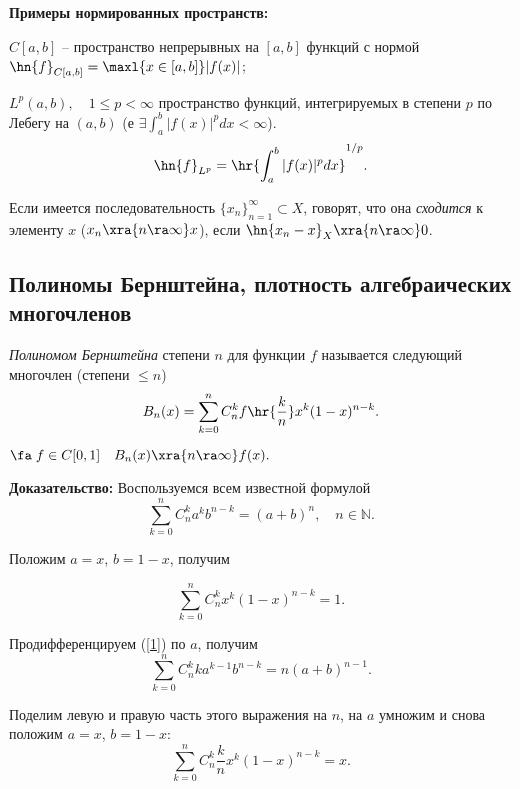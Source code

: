 \documentclass[a4paper]{article}
\begin{document}
\noindent\textbf{Примеры нормированных пространств:}

\begin{denote}
  $C[a,b]$ -- пространство непрерывных на $[a,b]$ функций с нормой
  $\hn{f}_{C[a,b]}=\maxl{x\in[a,b]}|f(x)|$;
\end{denote}

\begin{denote}
  $L^p(a,b),\quad 1\le p<\infty$ пространство функций, интегрируемых в
  степени $p$ по Лебегу на $(a,b)$ (е
  $\exi\int_a^b|f(x)|^pdx<\infty$).
  $$\hn{f}_{L^p}=\hr{\int_a^b|f(x)|^pdx }^{1/p}.$$
\end{denote}

\begin{df}
  Если имеется последовательность
  $\{x_n\}_{n=1}^{\infty}\subset X$, говорят, что она
  \emph{сходится} к элементу $x$ ($x_n\xra{n\ra\infty} x$), если
  $\hn{x_n-x}_X\xra{n\ra\infty} 0$.
\end{df}

\subsection{Полиномы Бернштейна, плотность алгебраических
многочленов}

\begin{df}
  \emph{Полиномом Бернштейна} степени $n$ для функции
  $f$ называется следующий многочлен (степени $\le n$)
  $$B_n(x)=\sum\limits_{k=0}^n C_n^k f\hr{\frac{k}{n}}x^k(1-x)^{n-k}.$$
\end{df}
\begin{theorem}[Бернштейн]
$\fa \;f\in C[0,1]\quad B_n(x)\xra{n\ra\infty}
f(x).$
\end{theorem}
\textbf{Доказательство:} Воспользуемся всем известной формулой
\begin{equation}\label{1}
\sum_{k=0}^n C_n^k a^k b^{n-k}=(a+b)^n,\quad n\in\mathbb{N}.
\end{equation}

Положим $a=x$, $b=1-x$, получим

\begin{equation}\label{2}
\sum_{k=0}^n C_n^k x^k (1-x)^{n-k}=1.
\end{equation}

Продифференцируем (\ref{1}) по $a$, получим
\begin{equation}\label{3}
\sum_{k=0}^n C_n^k ka^{k-1} b^{n-k}=n(a+b)^{n-1}.
\end{equation}

Поделим левую и правую часть этого выражения на $n$, на $a$ умножим и снова положим $a=x$, $b=1-x$:
\begin{equation}\label{4}
\sum_{k=0}^n C_n^k \frac{k}{n}x^k(1-x)^{n-k}=x.
\end{equation}
\end{document}

